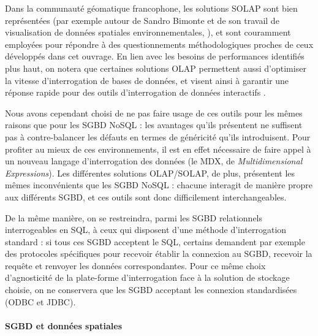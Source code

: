 			Dans la communauté géomatique francophone, les solutions SOLAP sont bien représentées (par exemple autour de Sandro Bimonte et de son travail de visualisation de données spatiales environnementales,  \autocite{bimonte_integration_2007, bimonte_towards_2005, zaamoune_new_2013}), et sont couramment employées pour répondre à des questionnements méthodologiques proches de ceux développés dans cet ouvrage.
			En lien avec les besoins de performances identifiés plus haut, on notera que certaines solutions OLAP permettent aussi d'optimiser la vitesse d'interrogation de bases de données, et visent ainsi à garantir une réponse rapide pour des outils d'interrogation de données interactifs \autocite{zeng_iolap_2016}.

			Nous avons cependant choisi de ne pas faire usage de ces outils pour les mêmes raisons que pour les SGBD NoSQL : les avantages qu'ils présentent ne suffisent pas à contre-balancer les défauts en termes de généricité qu'ils introduisent. Pour profiter au mieux de ces environnements, il est en effet nécessaire de faire appel à un nouveau langage d'interrogation des données (le \og MDX\fg{}, de \og \textit{Multidimensional Expressions}\fg{}).
			Les différentes solutions OLAP/SOLAP, de plus, présentent les mêmes inconvénients que les SGBD NoSQL : chacune interagit de manière propre aux différents SGBD, et ces outils sont donc difficilement interchangeables.

			De la même manière, on se restreindra, parmi les SGBD relationnels interrogeables en SQL, à ceux qui disposent d'une méthode d'interrogation standard : si tous ces SGBD acceptent le SQL, certains demandent par exemple des protocoles spécifiques pour recevoir établir la connexion au SGBD, recevoir la requête et renvoyer les données correspondantes.
			Pour ce même choix \og d'agnosticité \fg{} de la plate-forme d'interrogation face à la solution de stockage choisie, on ne conservera que les SGBD acceptant les connexion standardisées (ODBC et JDBC).

			\paragraph*{SGBD et données spatiales}\label{par:sgbd-spatial}

